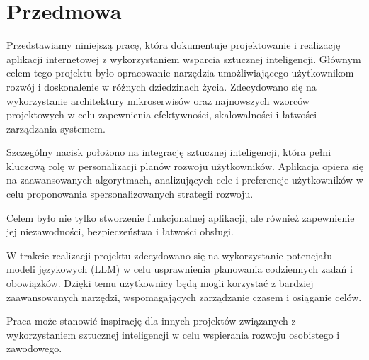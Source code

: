\section{Przedmowa}

\indent Przedstawiamy niniejszą pracę, która dokumentuje projektowanie i realizację aplikacji internetowej z wykorzystaniem wsparcia sztucznej inteligencji. Głównym celem tego projektu było opracowanie narzędzia umożliwiającego użytkownikom rozwój i doskonalenie w różnych dziedzinach życia. Zdecydowano się na wykorzystanie architektury mikroserwisów oraz najnowszych wzorców projektowych w celu zapewnienia efektywności, skalowalności i łatwości zarządzania systemem.

Szczególny nacisk położono na integrację sztucznej inteligencji, która pełni kluczową rolę w personalizacji planów rozwoju użytkowników. Aplikacja opiera się na zaawansowanych algorytmach, analizujących cele i preferencje użytkowników w celu proponowania spersonalizowanych strategii rozwoju.

Celem było nie tylko stworzenie funkcjonalnej aplikacji, ale również zapewnienie jej niezawodności, bezpieczeństwa i łatwości obsługi.

W trakcie realizacji projektu zdecydowano się na wykorzystanie potencjału modeli językowych (LLM) w celu usprawnienia planowania codziennych zadań i obowiązków. Dzięki temu użytkownicy będą mogli korzystać z bardziej zaawansowanych narzędzi, wspomagających zarządzanie czasem i osiąganie celów.

Praca może stanowić inspirację dla innych projektów związanych z wykorzystaniem sztucznej inteligencji w celu wspierania rozwoju osobistego i zawodowego.